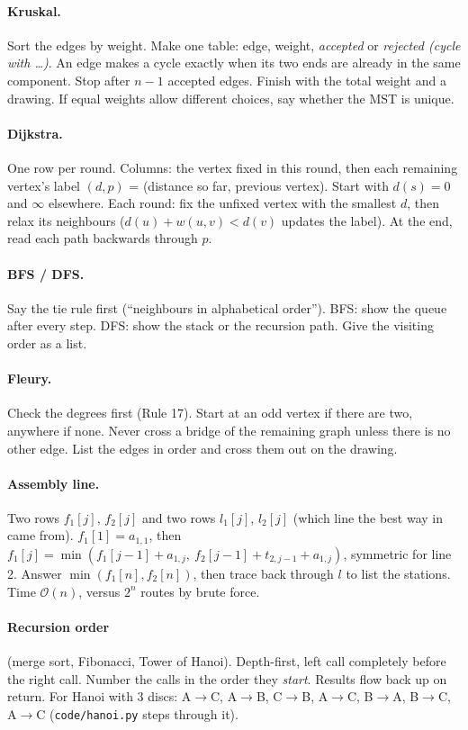 \documentclass{fkt-notes}
\newif\ifpublic
\newcommand{\priv}[2]{\ifpublic#2\else#1\fi}
\newcommand{\Oh}{\mathcal{O}}
\begin{document}
\paragraph{Kruskal.} Sort the edges by weight. Make one table: edge, weight, \emph{accepted} or \emph{rejected (cycle with \dots)}. An edge makes a cycle exactly when its two ends are already in the same component. Stop after $n-1$ accepted edges. Finish with the total weight and a drawing. If equal weights allow different choices, say whether the MST is unique.

\paragraph{Dijkstra.} One row per round. Columns: the vertex fixed in this round, then each remaining vertex's label $(d,p)$ = (distance so far, previous vertex). Start with $d(s)=0$ and $\infty$ elsewhere. Each round: fix the unfixed vertex with the smallest $d$, then relax its neighbours ($d(u)+w(u,v)<d(v)$ updates the label). At the end, read each path backwards through $p$.

\paragraph{BFS / DFS.} Say the tie rule first (``neighbours in alphabetical order''). BFS: show the queue after every step. DFS: show the stack or the recursion path. Give the visiting order as a list.

\paragraph{Fleury.} Check the degrees first (Rule 17). Start at an odd vertex if there are two, anywhere if none. Never cross a bridge of the remaining graph unless there is no other edge. List the edges in order and cross them out on the drawing.

\paragraph{Assembly line.} Two rows $f_1[j]$, $f_2[j]$ and two rows $l_1[j]$, $l_2[j]$ (which line the best way in came from). $f_1[1]=a_{1,1}$, then
$f_1[j]=\min(f_1[j-1]+a_{1,j},\ f_2[j-1]+t_{2,j-1}+a_{1,j})$, symmetric for line 2. Answer $\min(f_1[n],f_2[n])$, then trace back through $l$ to list the stations. Time $\Oh(n)$, versus $2^n$ routes by brute force.

\paragraph{Recursion order} (merge sort, Fibonacci, Tower of Hanoi). Depth-first, left call completely before the right call. Number the calls in the order they \emph{start}. Results flow back up on return. For Hanoi with 3 discs: A$\to$C, A$\to$B, C$\to$B, A$\to$C, B$\to$A, B$\to$C, A$\to$C\priv{ (\texttt{code/hanoi.py} steps through it)}{}.
\end{document}
